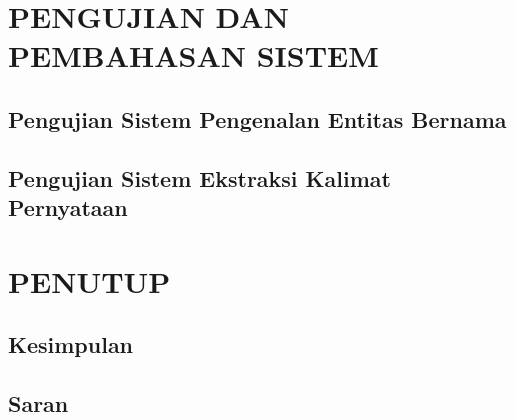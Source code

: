 \documentclass[ugmskripsi]{ugmskripsi}
\begin{document}



\chapter{PENGUJIAN DAN PEMBAHASAN SISTEM}
\label{PENGUJIAN DAN PEMBAHASAN SISTEM}


	\section{Pengujian Sistem Pengenalan Entitas Bernama}
	\label{pengujian sistem ner}
	

	\section{Pengujian Sistem Ekstraksi Kalimat Pernyataan}
	\label{pengujian sistem ekstraksi kalimat pernyataan}
	



\chapter{PENUTUP}
\label{PENUTUP}

	\section{Kesimpulan}
	\label{penutup kesimpulan}
	

	\section{Saran}
	\label{penutup saran}
	

\end{document}

